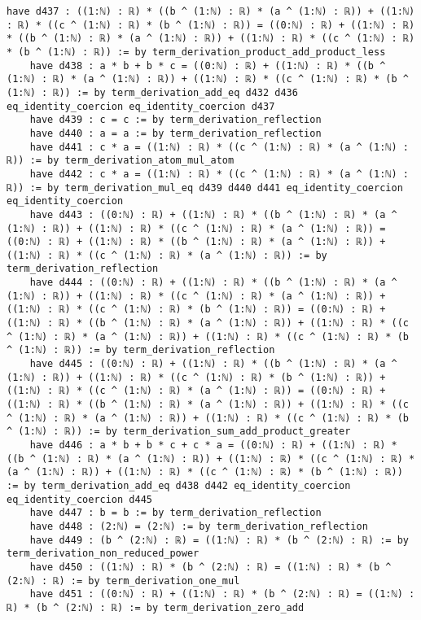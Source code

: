 \documentclass{article}
\begin{document}
\begin{tcolorbox}[colback=white!10, width=\linewidth]
\begin{lstlisting}[language=Lean4]
    have d437 : ((1:ℕ) : ℝ) * ((b ^ (1:ℕ) : ℝ) * (a ^ (1:ℕ) : ℝ)) + ((1:ℕ) : ℝ) * ((c ^ (1:ℕ) : ℝ) * (b ^ (1:ℕ) : ℝ)) = ((0:ℕ) : ℝ) + ((1:ℕ) : ℝ) * ((b ^ (1:ℕ) : ℝ) * (a ^ (1:ℕ) : ℝ)) + ((1:ℕ) : ℝ) * ((c ^ (1:ℕ) : ℝ) * (b ^ (1:ℕ) : ℝ)) := by term_derivation_product_add_product_less
    have d438 : a * b + b * c = ((0:ℕ) : ℝ) + ((1:ℕ) : ℝ) * ((b ^ (1:ℕ) : ℝ) * (a ^ (1:ℕ) : ℝ)) + ((1:ℕ) : ℝ) * ((c ^ (1:ℕ) : ℝ) * (b ^ (1:ℕ) : ℝ)) := by term_derivation_add_eq d432 d436 eq_identity_coercion eq_identity_coercion d437
    have d439 : c = c := by term_derivation_reflection
    have d440 : a = a := by term_derivation_reflection
    have d441 : c * a = ((1:ℕ) : ℝ) * ((c ^ (1:ℕ) : ℝ) * (a ^ (1:ℕ) : ℝ)) := by term_derivation_atom_mul_atom
    have d442 : c * a = ((1:ℕ) : ℝ) * ((c ^ (1:ℕ) : ℝ) * (a ^ (1:ℕ) : ℝ)) := by term_derivation_mul_eq d439 d440 d441 eq_identity_coercion eq_identity_coercion
    have d443 : ((0:ℕ) : ℝ) + ((1:ℕ) : ℝ) * ((b ^ (1:ℕ) : ℝ) * (a ^ (1:ℕ) : ℝ)) + ((1:ℕ) : ℝ) * ((c ^ (1:ℕ) : ℝ) * (a ^ (1:ℕ) : ℝ)) = ((0:ℕ) : ℝ) + ((1:ℕ) : ℝ) * ((b ^ (1:ℕ) : ℝ) * (a ^ (1:ℕ) : ℝ)) + ((1:ℕ) : ℝ) * ((c ^ (1:ℕ) : ℝ) * (a ^ (1:ℕ) : ℝ)) := by term_derivation_reflection
    have d444 : ((0:ℕ) : ℝ) + ((1:ℕ) : ℝ) * ((b ^ (1:ℕ) : ℝ) * (a ^ (1:ℕ) : ℝ)) + ((1:ℕ) : ℝ) * ((c ^ (1:ℕ) : ℝ) * (a ^ (1:ℕ) : ℝ)) + ((1:ℕ) : ℝ) * ((c ^ (1:ℕ) : ℝ) * (b ^ (1:ℕ) : ℝ)) = ((0:ℕ) : ℝ) + ((1:ℕ) : ℝ) * ((b ^ (1:ℕ) : ℝ) * (a ^ (1:ℕ) : ℝ)) + ((1:ℕ) : ℝ) * ((c ^ (1:ℕ) : ℝ) * (a ^ (1:ℕ) : ℝ)) + ((1:ℕ) : ℝ) * ((c ^ (1:ℕ) : ℝ) * (b ^ (1:ℕ) : ℝ)) := by term_derivation_reflection
    have d445 : ((0:ℕ) : ℝ) + ((1:ℕ) : ℝ) * ((b ^ (1:ℕ) : ℝ) * (a ^ (1:ℕ) : ℝ)) + ((1:ℕ) : ℝ) * ((c ^ (1:ℕ) : ℝ) * (b ^ (1:ℕ) : ℝ)) + ((1:ℕ) : ℝ) * ((c ^ (1:ℕ) : ℝ) * (a ^ (1:ℕ) : ℝ)) = ((0:ℕ) : ℝ) + ((1:ℕ) : ℝ) * ((b ^ (1:ℕ) : ℝ) * (a ^ (1:ℕ) : ℝ)) + ((1:ℕ) : ℝ) * ((c ^ (1:ℕ) : ℝ) * (a ^ (1:ℕ) : ℝ)) + ((1:ℕ) : ℝ) * ((c ^ (1:ℕ) : ℝ) * (b ^ (1:ℕ) : ℝ)) := by term_derivation_sum_add_product_greater
    have d446 : a * b + b * c + c * a = ((0:ℕ) : ℝ) + ((1:ℕ) : ℝ) * ((b ^ (1:ℕ) : ℝ) * (a ^ (1:ℕ) : ℝ)) + ((1:ℕ) : ℝ) * ((c ^ (1:ℕ) : ℝ) * (a ^ (1:ℕ) : ℝ)) + ((1:ℕ) : ℝ) * ((c ^ (1:ℕ) : ℝ) * (b ^ (1:ℕ) : ℝ)) := by term_derivation_add_eq d438 d442 eq_identity_coercion eq_identity_coercion d445
    have d447 : b = b := by term_derivation_reflection
    have d448 : (2:ℕ) = (2:ℕ) := by term_derivation_reflection
    have d449 : (b ^ (2:ℕ) : ℝ) = ((1:ℕ) : ℝ) * (b ^ (2:ℕ) : ℝ) := by term_derivation_non_reduced_power
    have d450 : ((1:ℕ) : ℝ) * (b ^ (2:ℕ) : ℝ) = ((1:ℕ) : ℝ) * (b ^ (2:ℕ) : ℝ) := by term_derivation_one_mul
    have d451 : ((0:ℕ) : ℝ) + ((1:ℕ) : ℝ) * (b ^ (2:ℕ) : ℝ) = ((1:ℕ) : ℝ) * (b ^ (2:ℕ) : ℝ) := by term_derivation_zero_add

\end{lstlisting}
\end{tcolorbox}
\end{document}
